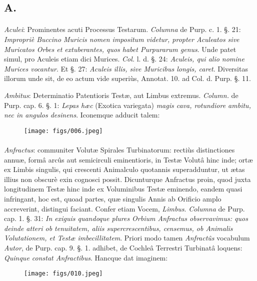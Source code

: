 \documentclass[a4paper, 11pt, oneside, polutonikogreek, german]{article}
\begin{document}
\bigskip

\subsection{A.}
\paragraph{}
\emph{Aculei}: Prominentes acuti Processus Testarum. \emph{Columna} de Purp. c. 1. §. 21: \emph{Impropriè Buccino Muricis nomen impositum videtur, propter Aculeatos sive Muricatos Orbes et extuberantes, quos habet Purpurarum genus}. Unde patet simul, pro Aculeis etiam dici Murices. \emph{Col.} l. d. §. 24: \emph{Aculeis, qui alio nomine Murices vocantur}. Et §. 27: \emph{Aculeis illis, sive Muricibus longis, caret}. Diversitas illorum unde sit, de eo actum vide superiùs, Annotat. 10. ad Col. d. Purp. §. 11.

\emph{Ambitus}: Determinatio Patentioris Testæ, aut Limbus extremus. \emph{Column.} de Purp. cap. 6. §. 1: \emph{Lepas hæc} (Exotica variegata) \emph{magis cava, rotundiore ambitu, nec in angulos desinens}. Iconemque adducit talem:

\begin{figure}[H]
\centering
\texttt{[image: figs/006.jpeg]}
\end{figure}
\paragraph{}
\emph{Anfractus}: communiter Volutæ Spirales Turbinatorum: rectiùs distinctiones annuæ, formâ arcûs aut semicirculi eminentioris, in Testæ Volutâ hinc inde; ortæ ex Limbis singulis, qui crescenti Animalculo quotannis superadduntur, ut ætas illius non obscurè exin cognosci possit. Dicunturque Anfractus proin, quod juxta longitudinem Testæ hinc inde ex Voluminibus Testæ eminendo, eandem quasi infringant, hoc est, quoad partes, quæ singulis Annis ab Orificio amplo accreverint, distingui faciant. Confer etiam Vocem, \emph{Limbus}. \emph{Columna} de Purp. cap. 1. §. 31: \emph{In exiguis quandoque plures Orbium Anfractus observavimus: quos deinde atteri ob tenuitatem, aliis supercrescentibus, censemus, ob Animalis Volutationem, et Testæ imbecillitatem}. Priori modo tamen \emph{Anfractûs} vocabulum \emph{Autor}, de Purp. cap. 9. §. 1. adhibet, de Cochleâ Terrestri Turbinatâ loquens: \emph{Quinque constat Anfractibus}. Hancque dat imaginem:

\begin{figure}[H]
\centering
\texttt{[image: figs/010.jpeg]}
\end{figure}
\end{document}
